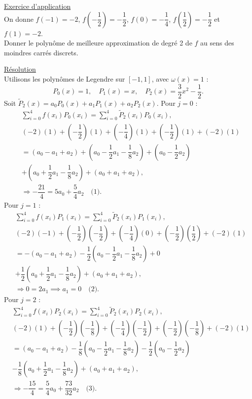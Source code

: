 \underline{Exercice d'application} \\
On donne $f(-1)=-2$, $f(-\dfrac{1}{2})=-\dfrac{1}{2}$, $f(0)=-\dfrac{1}{4}$, $f(\dfrac{1}{2})=-\dfrac{1}{2}$ et $f(1)=-2$. \\
Donner le polynôme de meilleure approximation de degré 2 de $f$ au sens des moindres carrés discrets.

\underline{Résolution} \\
Utilisons les polynômes de Legendre sur $[-1,1]$, avec $\omega(x)=1$ :
\[
P_0(x)=1, \quad P_1(x)=x, \quad P_2(x)=\dfrac{3}{2}x^2-\dfrac{1}{2}.
\]
Soit $\tilde{P}_2(x)=a_0 P_0(x) + a_1 P_1(x) + a_2 P_2(x)$.
Pour $j=0$ :
\begin{align*}
&\sum_{i=0}^{4} f(x_i)P_0(x_i) = \sum_{i=0}^{4} \tilde{P}_2(x_i)P_0(x_i), \\
&(-2)(1) + \left(-\dfrac{1}{2}\right)(1) + \left(-\dfrac{1}{4}\right)(1) + \left(-\dfrac{1}{2}\right)(1) + (-2)(1) \\
&= (a_0 - a_1 + a_2) + \left(a_0 - \dfrac{1}{2}a_1 - \dfrac{1}{8}a_2\right) + \left(a_0 - \dfrac{1}{2}a_2\right) \\
&+ \left(a_0 + \dfrac{1}{2}a_1 - \dfrac{1}{8}a_2\right) + (a_0 + a_1 + a_2), \\
&\Rightarrow -\dfrac{21}{4} = 5a_0 + \dfrac{5}{4}a_2 \quad \text{(1)}.
\end{align*}
Pour $j=1$ :
\begin{align*}
&\sum_{i=0}^{4} f(x_i)P_1(x_i) = \sum_{i=0}^{4} \tilde{P}_2(x_i)P_1(x_i), \\
&(-2)(-1) + \left(-\dfrac{1}{2}\right)\left(-\dfrac{1}{2}\right) + \left(-\dfrac{1}{4}\right)(0) + \left(-\dfrac{1}{2}\right)\left(\dfrac{1}{2}\right) + (-2)(1) \\
&= -(a_0 - a_1 + a_2) - \dfrac{1}{2}\left(a_0 - \dfrac{1}{2}a_1 - \dfrac{1}{8}a_2\right) + 0 \\
&+ \dfrac{1}{2}\left(a_0 + \dfrac{1}{2}a_1 - \dfrac{1}{8}a_2\right) + (a_0 + a_1 + a_2), \\
&\Rightarrow 0 = 2a_1 \implies a_1 = 0 \quad \text{(2)}.
\end{align*}
Pour $j=2$ :
\begin{align*}
&\sum_{i=0}^{4} f(x_i)P_2(x_i) = \sum_{i=0}^{4} \tilde{P}_2(x_i)P_2(x_i), \\
&(-2)(1) + \left(-\dfrac{1}{2}\right)\left(-\dfrac{1}{8}\right) + \left(-\dfrac{1}{4}\right)\left(-\dfrac{1}{2}\right) + \left(-\dfrac{1}{2}\right)\left(-\dfrac{1}{8}\right) + (-2)(1) \\
&= (a_0 - a_1 + a_2) - \dfrac{1}{8}\left(a_0 - \dfrac{1}{2}a_1 - \dfrac{1}{8}a_2\right) - \dfrac{1}{2}\left(a_0 - \dfrac{1}{2}a_2\right) \\
&- \dfrac{1}{8}\left(a_0 + \dfrac{1}{2}a_1 - \dfrac{1}{8}a_2\right) + (a_0 + a_1 + a_2), \\
&\Rightarrow -\dfrac{15}{4} = \dfrac{5}{4}a_0 + \dfrac{73}{32}a_2 \quad \text{(3)}.
\end{align*}
